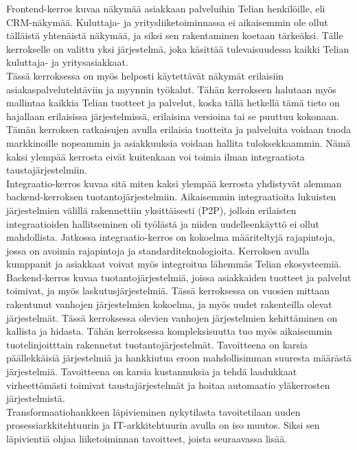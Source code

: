 \documentclass[finnish,12pt,a4paper,pdftex]{article}
\begin{document}
Frontend-kerros kuvaa näkymää asiakkaan palveluihin Telian henkilöille, eli CRM-näkymää. Kuluttaja- ja yritysliiketoiminnassa ei aikaisemmin ole ollut tälläistä yhtenäistä näkymää, ja siksi sen rakentaminen koetaan tärkeäksi. Tälle kerrokselle on valittu yksi järjestelmä, joka käsittää tulevaisuudessa kaikki Telian kuluttaja- ja yritysasiakkaat. \\

Tässä kerroksessa on myös helposti käytettävät näkymät erilaisiin asiakaspalvelutehtäviin ja myynnin työkalut. Tähän kerrokseen halutaan myös mallintaa kaikkia Telian tuotteet ja palvelut, koska tällä hetkellä tämä tieto on hajallaan erilaisissa järjestelmissä, erilaisina versioina tai se puuttuu kokonaan. Tämän kerroksen ratkaisujen avulla erilaisia tuotteita ja palveluita voidaan tuoda markkinoille nopeammin ja asiakkuuksia voidaan hallita tuloksekkaammin. Nämä kaksi ylempää kerrosta eivät kuitenkaan voi toimia ilman integraatiota taustajärjestelmiin.\\

Integraatio-kerros kuvaa sitä miten kaksi ylempää kerrosta yhdistyvät alemman backend-kerroksen tuotantojärjestelmiin. Aikaisemmin integraatioita lukuisten järjestelmien välillä rakennettiin yksittäisesti (P2P), jolloin erilaisten integraatioiden hallitseminen oli työlästä ja niiden uudelleenkäyttö ei ollut mahdollista. Jatkossa integraatio-kerros on kokoelma määriteltyjä rajapintoja, jossa on avoimia rajapintoja ja standarditeknologioita. Kerroksen avulla kumppanit ja asiakkaat voivat myös integroitua lähemmäs Telian ekosysteemiä. \\

Backend-kerros kuvaa tuotantojärjestelmiä, joissa asiakkaiden tuotteet ja palvelut toimivat, ja myös laskutusjärjestelmiä. Tässä kerroksessa on vuosien mittaan rakentunut vanhojen järjestelmien kokoelma, ja myös uudet rakenteilla olevat järjestelmät. Tässä kerroksessa olevien vanhojen järjestelmien kehittäminen on kallista ja hidasta. Tähän kerroksessa kompleksisuutta tuo myös aikaisemmin tuotelinjoitttain rakennetut tuotantojärjestelmät. Tavoitteena on karsia päällekkäisiä järjestelmiä ja hankkiutua eroon mahdollisimman suuresta määrästä järjestelmiä. Tavoitteena on karsia kustannuksia ja tehdä laadukkaat virheettömästi toimivat taustajärjestelmät ja hoitaa automaatio yläkerrosten järjestelmistä. \\

Transformaatiohankkeen läpivieminen nykytilasta tavoitetilaan uuden prosessiarkkitehtuurin ja IT-arkkitehtuurin avulla on iso muutos. Siksi sen läpivientiä ohjaa liiketoiminnan tavoitteet, joista seuraavassa lisää.\\
\end{document}
